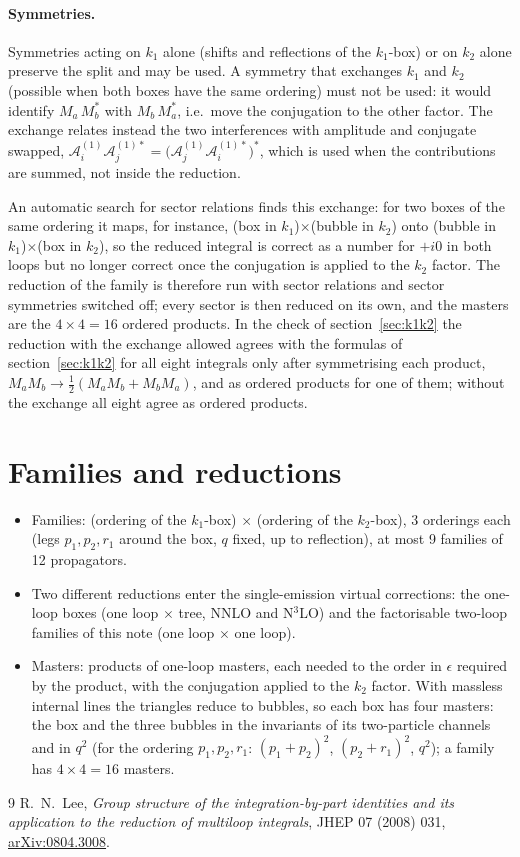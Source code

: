 \documentclass[11pt,a4paper]{article}
\newcommand{\ep}{\epsilon}
\begin{document}
\paragraph{Symmetries.} Symmetries acting on $k_1$ alone (shifts and reflections of the $k_1$-box) or on $k_2$ alone
preserve the split and may be used. A symmetry that exchanges $k_1$ and $k_2$ (possible when both boxes have the same
ordering) must not be used: it would identify $M_a\,M_b^*$ with $M_b\,M_a^*$, i.e.\ move the conjugation to the
other factor. The exchange relates instead the two interferences with amplitude and conjugate swapped,
$\mathcal{A}_i^{(1)}\mathcal{A}_j^{(1)*}=\big(\mathcal{A}_j^{(1)}\mathcal{A}_i^{(1)*}\big)^*$, which is used when the
contributions are summed, not inside the reduction.

An automatic search for sector relations finds this exchange: for two boxes of the same ordering it maps, for
instance, (box in $k_1$)$\times$(bubble in $k_2$) onto (bubble in $k_1$)$\times$(box in $k_2$), so the reduced
integral is correct as a number for $+i0$ in both loops but no longer correct once the conjugation is applied to the
$k_2$ factor. The reduction of the family is therefore run with sector relations and sector symmetries switched off;
every sector is then reduced on its own, and the masters are the $4\times4=16$ ordered products. In the check of
section~\ref{sec:k1k2} the reduction with the exchange allowed agrees with the formulas of section~\ref{sec:k1k2} for
all eight integrals only after symmetrising each product, $M_a M_b\to\tfrac12(M_aM_b+M_bM_a)$, and as ordered products
for one of them; without the exchange all eight agree as ordered products.

\section{Families and reductions}

\begin{itemize}
\item Families: (ordering of the $k_1$-box) $\times$ (ordering of the $k_2$-box), 3 orderings each (legs
$p_1,p_2,r_1$ around the box, $q$ fixed, up to reflection), at most 9 families of 12 propagators.
\item Two different reductions enter the single-emission virtual corrections: the one-loop boxes (one loop $\times$
tree, NNLO and N$^3$LO) and the factorisable two-loop families of this note (one loop $\times$ one loop).
\item Masters: products of one-loop masters, each needed to the order in $\ep$ required by the product, with the
conjugation applied to the $k_2$ factor. With massless internal lines the triangles reduce to bubbles, so each box
has four masters: the box and the three bubbles in the invariants of its two-particle channels and in $q^2$ (for the
ordering $p_1,p_2,r_1$: $(p_1+p_2)^2$, $(p_2+r_1)^2$, $q^2$); a family has $4\times4=16$ masters.
\end{itemize}

\begin{thebibliography}{9}
 R.~N.~Lee, \emph{Group structure of the integration-by-part identities and its application to the
reduction of multiloop integrals}, JHEP 07 (2008) 031, \href{https://arxiv.org/abs/0804.3008}{arXiv:0804.3008}.
\end{thebibliography}
\end{document}
